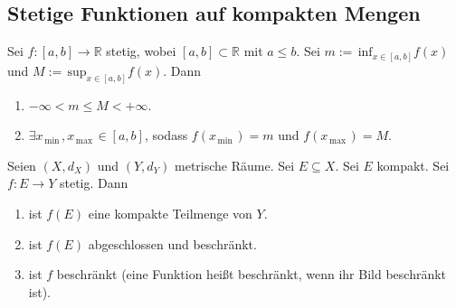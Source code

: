 \documentclass[a4paper,12pt]{article}
\begin{document}
\subsection{Stetige Funktionen auf kompakten Mengen}
Sei $f:[a,b]\rightarrow \mathbb{R}$ stetig, wobei $[a,b]\subset \mathbb{R}$ mit $a\leq b$. Sei $m:=\,\text{inf}_{x \in [a,b]}f(x)$ und $M:=\,\text{sup}_{x \in [a,b]}f(x)$. Dann 
\begin{enumerate}[label=\arabic*.]
        \item $-\infty<m\leq M<+\infty$.
        \item $\exists x_{\,\text{min}\,},x_{\,\text{max}\,} \in [a,b]$, sodass $f\left(x_{\,\text{min}\,}\right)=m$ und $f\left(x_{\,\text{max}\,}\right)=M$.
\end{enumerate}
Seien $(X,d_X)$ und $(Y,d_Y)$ metrische Räume. Sei $E\subseteq X$. Sei $E$ kompakt. Sei $f:E\rightarrow Y$ stetig. Dann 
\begin{enumerate}[label=\arabic*.]
        \item ist $f(E)$ eine kompakte Teilmenge von $Y$.
        \item ist $f(E)$ abgeschlossen und beschränkt.
        \item ist $f$ beschränkt (eine Funktion heißt beschränkt, wenn ihr Bild beschränkt ist).
\end{enumerate}
\end{document}
